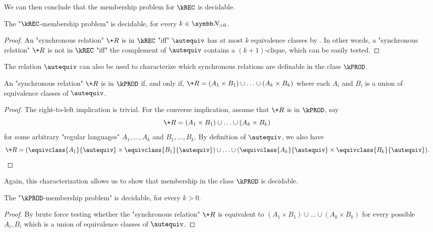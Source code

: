 We can then conclude that the membership problem for $\kREC$ is decidable. 

\begin{corollary}
    The "$\kREC$-membership problem" is decidable, for every $k \in \Np$.
\end{corollary}
\begin{proof}
    An "synchronous relation" $\+R$ is in $\kREC$ "iff" $\autequiv$ has at most $k$ equivalence classes by . 
    In other words, a "synchronous relation" $\+R$ is not in $\kREC$ "iff" the complement of $\autequiv$ contains a $(k+1)$-clique, which can be easily tested.
\end{proof}

The relation $\autequiv$ can also be used to characterize which synchronous relations are definable in the class $\kPROD$.

\begin{proposition}
    An "synchronous relation" $\+R$ is in $\kPROD$ if, and only if, $\+R=(A_1 \times B_1) \cup \hdots \cup (A_k \times B_k)$ where each $A_i$ and $B_i$ is a union of equivalence classes of $\autequiv$.
\end{proposition}
\begin{proof}
    The right-to-left implication is trivial. For the converse implication,
    assume that $\+R$ is in $\kPROD$, say
    \[
        \+R=(A_1 \times B_1) \cup \hdots \cup (A_k \times B_k)
    \]
    for some arbitrary "regular languages" $A_1,\hdots,A_k$ and $B_1,\hdots,B_k$.
    By definition of $\autequiv$, we also have
    \[
        \+R=(\equivclass{A_1}{\autequiv} \times \equivclass{B_1}{\autequiv})
        \cup \hdots \cup (\equivclass{A_k}{\autequiv} \times \equivclass{B_k}{\autequiv}).\qedhere
    \]
\end{proof}

Again, this characterization allows us to show that membership in the class $\kPROD$ is decidable. 

\begin{corollary}
    The "$\kPROD$-membership problem" is decidable, for every $k > 0$.
\end{corollary}

\begin{proof}
    By brute force testing whether the "synchronous relation" $\+R$ is equivalent to $(A_1 \times B_1) \cup \hdots \cup (A_k \times B_k)$ for every possible $A_i,B_i$ which is a union of equivalence classes of $\autequiv$.
\end{proof}
